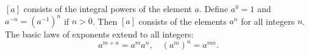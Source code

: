 $[a]$ consists of the integral powers of the element $a$. Define $a^0 = 1$ and $a^{-n} = (a^{-1})^n$ if $n > 0$. Then $[a]$ consists of the elements $a^n$ for all integers $n$. The basic laws of exponents extend to all integers:
$$a^{m+n} = a^m a^n, \quad (a^m)^n = a^{mn}.$$
